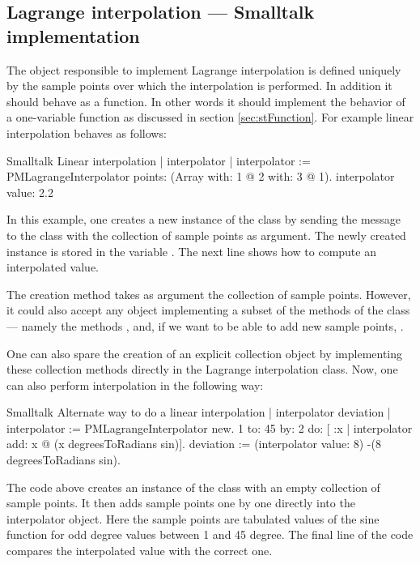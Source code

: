 \subsection{Lagrange interpolation --- Smalltalk implementation}
The object responsible to implement Lagrange interpolation is defined
uniquely by the sample points over which the interpolation is
performed. In addition it should behave as a function. In other
words it should implement the behavior of a one-variable function
as discussed in section \ref{sec:stFunction}. For example linear
interpolation behaves as follows:

\begin{listing}[label=ex:lagrangeS1]{Smalltalk}
{Linear interpolation}
| interpolator |
interpolator := PMLagrangeInterpolator
                        points: (Array with: 1 @ 2
                                        with: 3 @ 1).
interpolator value: 2.2
\end{listing}

In this example, one creates a new instance of the class  by sending the message  to the class  with the collection of
sample points as argument.
The newly created instance is stored in the variable .
The next line shows how to compute an interpolated value.

The creation method  takes as argument the collection
of sample points. However, it could also accept any object
implementing a subset of the methods of the class 
--- namely the methods ,  and, if we want to be
able to add new sample points, .

One can also spare the creation of an explicit collection object
by implementing these collection methods directly in the Lagrange
interpolation class.
Now, one can also perform interpolation in the following way:

\begin{listing}[label=ex:lagrangeS2]{Smalltalk}
{Alternate way to do a linear interpolation}
| interpolator deviation |
interpolator := PMLagrangeInterpolator new.
1 to: 45 by: 2 do:
                [ :x | interpolator add: x @ (x degreesToRadians sin)].
deviation := (interpolator value: 8) -(8 degreesToRadians sin).
\end{listing}

The code above creates an instance of the class  with an empty collection of sample points. It then adds sample points one by one directly into the
interpolator object. Here the sample points are tabulated values
of the sine function for odd degree values between 1 and 45
degree. The final line of the code compares the interpolated value
with the correct one.

